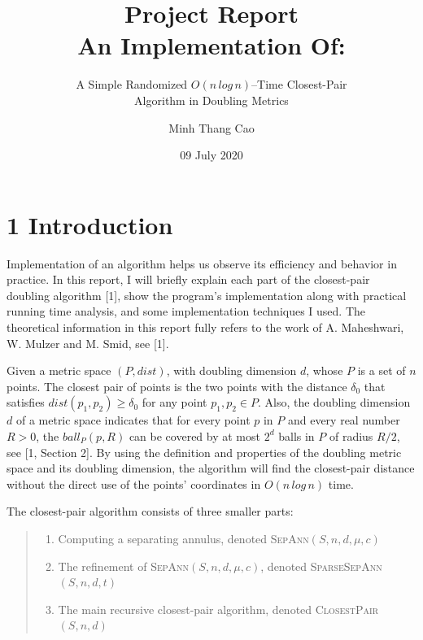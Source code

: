 \documentclass[12pt,english,]{article}
\title{\textbf{Project Report}\\
\Large{An Implementation Of:}}
\subtitle{A Simple Randomized \(O(n\,log\, n)\)--Time Closest-Pair\\
Algorithm in Doubling Metrics}
\author{Minh Thang Cao}
\date{09 July 2020}
\begin{document}
\maketitle

\hypertarget{introduction}{%
\section{\texorpdfstring{1
\enspace Introduction}{1 Introduction}}\label{introduction}}

Implementation of an algorithm helps us observe its efficiency and
behavior in practice. In this report, I will briefly explain each part
of the closest-pair doubling algorithm {[}1{]}, show the program's
implementation along with practical running time analysis, and some
implementation techniques I used. The theoretical information in this
report fully refers to the work of A. Maheshwari, W. Mulzer and M. Smid,
see {[}1{]}.

Given a metric space \((P,dist)\), with doubling dimension \(d\), whose
\(P\) is a set of \(n\) points. The closest pair of points is the two
points with the distance \(\delta_0\) that satisfies
\(dist(p_1, p_2) \geq \delta_0\) for any point \(p_1, p_2 \in P\). Also,
the doubling dimension \(d\) of a metric space indicates that for every
point \(p\) in \(P\) and every real number \(R > 0\), the
\(ball_P(p, R)\) can be covered by at most \(2^d\) balls in \(P\) of
radius \(R/2\), see {[}1, Section 2{]}. By using the definition and
properties of the doubling metric space and its doubling dimension, the
algorithm will find the closest-pair distance without the direct use of
the points' coordinates in \(O(n\,log\,n)\) time.

The closest-pair algorithm consists of three smaller parts:

\vspace{-2.5truemm}

\begin{quote}
\begin{enumerate}
\item Computing a separating annulus, denoted \textsc{SepAnn}$(S,n,d,\mu,c)$
\item The refinement of \textsc{SepAnn}$(S,n,d,\mu,c)$, denoted \textsc{SparseSepAnn}$(S,n,d,t)$
\item The main recursive closest-pair algorithm, denoted \textsc{ClosestPair}$(S,n,d)$
\end{enumerate}
\end{quote}
\end{document}
